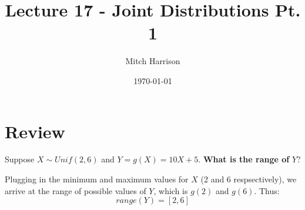 \documentclass[titlepage, 12pt, leqno]{article}
\title{\Huge{Lecture 17 - Joint Distributions Pt. 1}}
\author{\large{Mitch Harrison}}
\date{\today}
\begin{document}
\setlength{\parskip}{1\baselineskip}
\setlength{\parindent}{15pt}
\maketitle
\tableofcontents
\newpage


\section{Review}

\begin{ex}
    Suppose $X \sim Unif(2,6)$ and $Y = g(X) = 10X+5$. \textbf{What is the
    range of} $Y$?
    \vspace{10px}
    
    Plugging in the minimum and maximum values for $X$ (2 and 6 respsectively),
    we arrive at the range of possible values of $Y$, which is $g(2)$ and $g(6)$.
    Thus:
    \[
        \boxed{range(Y) = [2,6]} 
    \]
\end{ex}

\pagebreak
\end{document}
